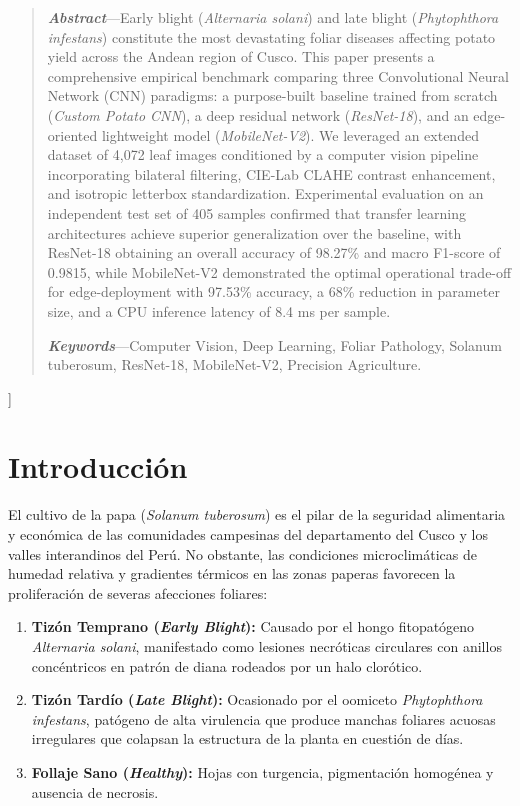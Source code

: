 \documentclass[10pt,a4paper,twoside]{article}
\begin{document}
  \begin{quotation}
    \noindent \textbf{\textit{Abstract}}---Early blight (\textit{Alternaria solani}) and late blight (\textit{Phytophthora infestans}) constitute the most devastating foliar diseases affecting potato yield across the Andean region of Cusco. This paper presents a comprehensive empirical benchmark comparing three Convolutional Neural Network (CNN) paradigms: a purpose-built baseline trained from scratch (\textit{Custom Potato CNN}), a deep residual network (\textit{ResNet-18}), and an edge-oriented lightweight model (\textit{MobileNet-V2}). We leveraged an extended dataset of 4,072 leaf images conditioned by a computer vision pipeline incorporating bilateral filtering, CIE-Lab CLAHE contrast enhancement, and isotropic letterbox standardization. Experimental evaluation on an independent test set of 405 samples confirmed that transfer learning architectures achieve superior generalization over the baseline, with ResNet-18 obtaining an overall accuracy of 98.27\% and macro F1-score of 0.9815, while MobileNet-V2 demonstrated the optimal operational trade-off for edge-deployment with 97.53\% accuracy, a 68\% reduction in parameter size, and a CPU inference latency of 8.4 ms per sample.
    
    \vspace{0.2cm}
    \noindent \textbf{\textit{Keywords}}---Computer Vision, Deep Learning, Foliar Pathology, Solanum tuberosum, ResNet-18, MobileNet-V2, Precision Agriculture.
  \end{quotation}
  \vspace{0.6cm}
]


\section{Introducción}
El cultivo de la papa (\textit{Solanum tuberosum}) es el pilar de la seguridad alimentaria y económica de las comunidades campesinas del departamento del Cusco y los valles interandinos del Perú. No obstante, las condiciones microclimáticas de humedad relativa y gradientes térmicos en las zonas paperas favorecen la proliferación de severas afecciones foliares:
\begin{enumerate}
    \item \textbf{Tizón Temprano (\textit{Early Blight}):} Causado por el hongo fitopatógeno \textit{Alternaria solani}, manifestado como lesiones necróticas circulares con anillos concéntricos en patrón de diana rodeados por un halo clorótico.
    \item \textbf{Tizón Tardío (\textit{Late Blight}):} Ocasionado por el oomiceto \textit{Phytophthora infestans}, patógeno de alta virulencia que produce manchas foliares acuosas irregulares que colapsan la estructura de la planta en cuestión de días.
    \item \textbf{Follaje Sano (\textit{Healthy}):} Hojas con turgencia, pigmentación homogénea y ausencia de necrosis.
\end{enumerate}
\end{document}

